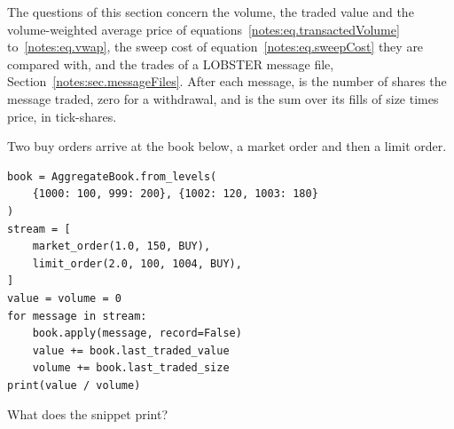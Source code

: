 The questions of this section concern
the volume, the traded value and the volume-weighted average price
of equations~\eqref{notes:eq.transactedVolume} to~\eqref{notes:eq.vwap},
the sweep cost of equation~\eqref{notes:eq.sweepCost} they are compared with,
and the trades of a LOBSTER message file, Section~\ref{notes:sec.messageFiles}.
After each message,
 is the number of shares the message traded,
zero for a withdrawal,
and  is the sum over its fills of size times price,
in tick-shares.

\begin{question}
\label{question.vwapOfABatchAgainstTheBookItLeaves}
Two buy orders arrive at the book below,
a market order and then a limit order.
\begin{lstlisting}[caption={The VWAP of a batch of two orders}, label=listing.vwapOfABatch]
book = AggregateBook.from_levels(
    {1000: 100, 999: 200}, {1002: 120, 1003: 180}
)
stream = [
    market_order(1.0, 150, BUY),
    limit_order(2.0, 100, 1004, BUY),
]
value = volume = 0
for message in stream:
    book.apply(message, record=False)
    value += book.last_traded_value
    volume += book.last_traded_size
print(value / volume)
\end{lstlisting}
What does the snippet print?
\begin{choices}
 \choice {}
 \choice {}
 \correctchoice {}
 \choice {}
 \choice {}
\end{choices}
\end{question}

